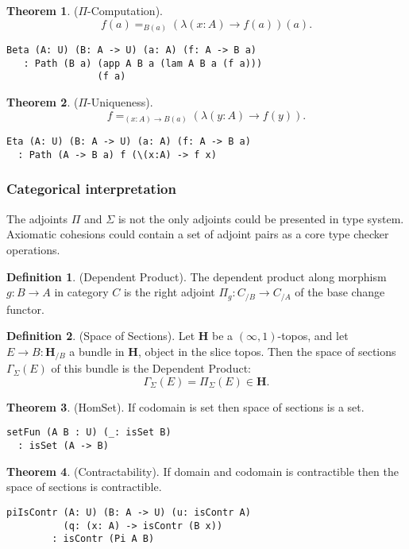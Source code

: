 \documentclass[twocolumn,10pt]{article}
\theoremstyle{definition}
\newtheorem{theorem}{Theorem}
\newtheorem{definition}{Definition}
\begin{document}
\begin{theorem} ($\Pi$-Computation).
$$f(a) =_{B(a)} (\lambda (x:A) \rightarrow f(a))(a).$$
\begin{lstlisting}
Beta (A: U) (B: A -> U) (a: A) (f: A -> B a)
   : Path (B a) (app A B a (lam A B a (f a)))
                (f a)
\end{lstlisting}
\end{theorem}

\begin{theorem} ($\Pi$-Uniqueness).
$$f =_{(x:A)\rightarrow B(a)} (\lambda (y:A) \rightarrow f(y)).$$
\begin{lstlisting}
Eta (A: U) (B: A -> U) (a: A) (f: A -> B a)
  : Path (A -> B a) f (\(x:A) -> f x)
\end{lstlisting}
\end{theorem}

\subsubsection*{Categorical interpretation}

The adjoints $\Pi$ and $\Sigma$ is not the only adjoints could be presented in type system.
Axiomatic cohesions could contain a set of adjoint pairs as a core type checker operations.

\begin{definition} (Dependent Product).
The dependent product along morphism $g: B \rightarrow A$ in category $C$ is the right
adjoint $\Pi_g : C_{/B} \rightarrow C_{/A}$ of the base change functor.
\end{definition}

\begin{definition} (Space of Sections).
Let $\mathbf{H}$ be a $(\infty,1)$-topos, and let $E \rightarrow B : \mathbf{H}_{/B}$ a bundle in
$\mathbf{H}$, object in the slice topos. Then the space of sections $\Gamma_\Sigma(E)$
of this bundle is the Dependent Product:
$$ \Gamma_\Sigma(E) = \Pi_\Sigma (E) \in \mathbf{H}. $$
\end{definition}

\begin{theorem} (HomSet).
If codomain is set then space of sections is a set.
\begin{lstlisting}
setFun (A B : U) (_: isSet B)
  : isSet (A -> B)
\end{lstlisting}
\end{theorem}

\begin{theorem} (Contractability).
If domain and codomain is contractible then the space of sections is contractible.
\begin{lstlisting}
piIsContr (A: U) (B: A -> U) (u: isContr A)
          (q: (x: A) -> isContr (B x))
        : isContr (Pi A B)
\end{lstlisting}
\end{theorem}
\end{document}
